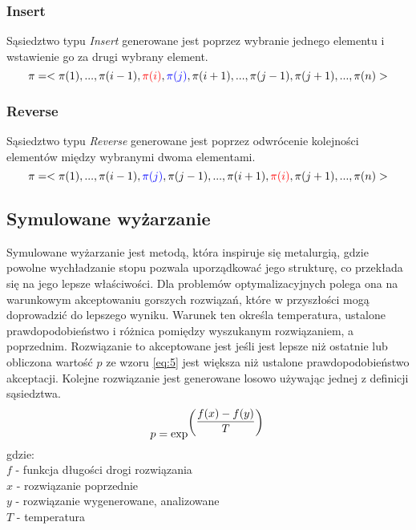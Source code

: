 \documentclass[12pt]{article}
\begin{document}
\subsubsection{Insert}
Sąsiedztwo typu \textit{Insert} generowane jest poprzez wybranie jednego elementu i wstawienie go za drugi wybrany element.
\begin{equation}
    \label{eq:3}
    \pi=<\pi(1),...,\pi(i-1),\mathbin{\color{red}\pi(i)},\mathbin{\color{blue}\pi(j)},\pi(i+1),...,\pi(j-1),\pi(j+1),...,\pi(n)>
\end{equation}
\subsubsection{Reverse}
Sąsiedztwo typu \textit{Reverse} generowane jest poprzez odwrócenie kolejności elementów między wybranymi dwoma elementami.
\begin{equation}
    \label{eq:4}
    \pi=<\pi(1),...,\pi(i-1),\mathbin{\color{blue}\pi(j)},\pi(j-1),...,\pi(i+1),\mathbin{\color{red}\pi(i)},\pi(j+1),...,\pi(n)>
\end{equation}
\subsection{Symulowane wyżarzanie}

Symulowane wyżarzanie jest metodą, która inspiruje się metalurgią, gdzie powolne wychładzanie stopu pozwala uporządkować jego strukturę, co przekłada się na jego lepsze właściwości.
Dla problemów optymalizacyjnych polega ona na warunkowym akceptowaniu gorszych rozwiązań, które w przyszłości mogą doprowadzić do lepszego wyniku. Warunek ten określa temperatura, ustalone prawdopodobieństwo i różnica pomiędzy wyszukanym rozwiązaniem, a poprzednim.
Rozwiązanie to akceptowane jest jeśli jest lepsze niż ostatnie lub obliczona wartość $p$ ze wzoru \ref{eq:5} jest większa niż ustalone prawdopodobieństwo akceptacji. Kolejne rozwiązanie jest generowane losowo używając jednej z definicji sąsiedztwa.
\begin{equation}
    \label{eq:5}
    p = \exp^{\left(\dfrac{f(x)-f(y)}{T}\right)}\\
\end{equation}
gdzie:\\
$f$ - funkcja długości drogi rozwiązania\\
$x$ - rozwiązanie poprzednie\\
$y$ - rozwiązanie wygenerowane, analizowane\\
$T$ - temperatura
\end{document}

